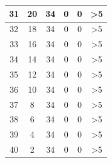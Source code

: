 \begin{longtable}{|c|c|c|c|c|c|}
	31                                           & 20                     & 34                    & 0                     & 0                      & >5                                              \\ \hline
	32                                           & 18                     & 34                    & 0                     & 0                      & >5                                              \\ \hline
	33                                           & 16                     & 34                    & 0                     & 0                      & >5                                            \\ \hline
	34                                           & 14                     & 34                    & 0                     & 0                      & >5                                             \\ \hline
	35                                           & 12                     & 34                    & 0                     & 0                      & >5                                             \\ \hline
	36                                           & 10                     & 34                    & 0                     & 0                      & >5                                             \\ \hline
	37                                           & 8                      & 34                    & 0                     & 0                      & >5                                            \\ \hline
	38                                           & 6                      & 34                    & 0                     & 0                      & >5                                             \\ \hline
	39                                           & 4                      & 34                    & 0                     & 0                      & >5                                             \\ \hline
	40                                           & 2                      & 34                    & 0                     & 0                      & >5                                            \\ \hline	
\end{longtable}

